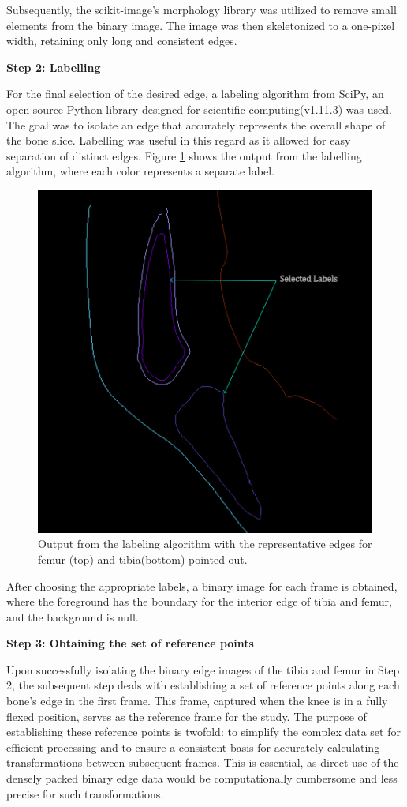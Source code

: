 \documentclass{micro-econ-thesis}
\begin{document}
Subsequently, the scikit-image's morphology library was utilized to remove small elements from the binary image. The image was then skeletonized to a one-pixel width, retaining only long and consistent edges. 

\textbf{Step 2: Labelling}

For the final selection of the desired edge, a labeling algorithm from SciPy, an open-source Python library designed for scientific computing(v1.11.3) was used. The goal was to isolate an edge that accurately represents the overall shape of the bone slice. Labelling was useful in this regard as it allowed for easy separation of distinct edges. Figure \ref{fig:labelimg} shows the output from the labelling algorithm, where each color represents a separate label. 

\begin{figure}[H]
	\centering
	\includegraphics[width=0.7\linewidth]{label_selected}
	\caption{Output from the labeling algorithm with the representative edges for femur (top) and tibia(bottom) pointed out.}
	\label{fig:labelimg}
\end{figure}
 
After choosing the appropriate labels, a binary image for each frame is obtained, where the foreground has the boundary for the interior edge of tibia and femur, and the background is null.   

\textbf{Step 3: Obtaining the set of reference points}

Upon successfully isolating the binary edge images of the tibia and femur in Step 2, the subsequent step deals with establishing a set of reference points along each bone's edge in the first frame. This frame, captured when the knee is in a fully flexed position, serves as the reference frame for the study. The purpose of establishing these reference points is twofold: to simplify the complex data set for efficient processing and to ensure a consistent basis for accurately calculating transformations between subsequent frames. This is essential, as direct use of the densely packed binary edge data would be computationally cumbersome and less precise for such transformations.
\end{document}
